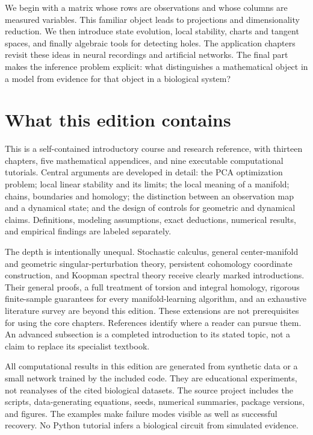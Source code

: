 We begin with a matrix whose rows are observations and whose columns are measured variables. This familiar object leads to projections and dimensionality reduction. We then introduce state evolution, local stability, charts and tangent spaces, and finally algebraic tools for detecting holes. The application chapters revisit these ideas in neural recordings and artificial networks. The final part makes the inference problem explicit: what distinguishes a mathematical object in a model from evidence for that object in a biological system?

\section*{What this edition contains}
This is a self-contained introductory course and research reference, with thirteen chapters, five mathematical appendices, and nine executable computational tutorials. Central arguments are developed in detail: the PCA optimization problem; local linear stability and its limits; the local meaning of a manifold; chains, boundaries and homology; the distinction between an observation map and a dynamical state; and the design of controls for geometric and dynamical claims. Definitions, modeling assumptions, exact deductions, numerical results, and empirical findings are labeled separately.

The depth is intentionally unequal. Stochastic calculus, general center-manifold and geometric singular-perturbation theory, persistent cohomology coordinate construction, and Koopman spectral theory receive clearly marked introductions. Their general proofs, a full treatment of torsion and integral homology, rigorous finite-sample guarantees for every manifold-learning algorithm, and an exhaustive literature survey are beyond this edition. These extensions are not prerequisites for using the core chapters. References identify where a reader can pursue them. An advanced subsection is a completed introduction to its stated topic, not a claim to replace its specialist textbook.

All computational results in this edition are generated from synthetic data or a small network trained by the included code. They are educational experiments, not reanalyses of the cited biological datasets. The source project includes the scripts, data-generating equations, seeds, numerical summaries, package versions, and figures. The examples make failure modes visible as well as successful recovery. No Python tutorial infers a biological circuit from simulated evidence.

